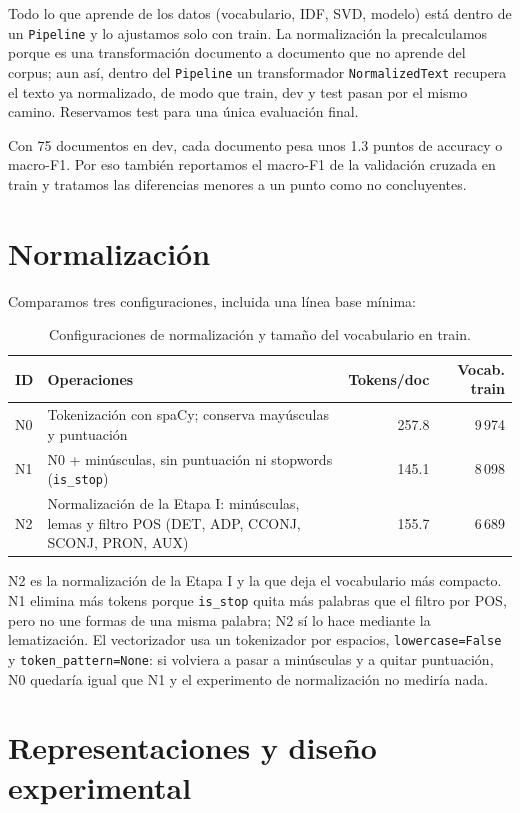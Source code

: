 \documentclass[11pt,a4paper]{article}
\newcommand{\code}[1]{\texttt{#1}}
\begin{document}
Todo lo que aprende de los datos (vocabulario, IDF, SVD, modelo) está dentro de un
\code{Pipeline} y lo ajustamos solo con train. La normalización la precalculamos porque es una
transformación documento a documento que no aprende del corpus; aun así, dentro del
\code{Pipeline} un transformador \code{NormalizedText} recupera el texto ya normalizado,
de modo que train, dev y test pasan por el mismo camino. Reservamos test para una única
evaluación final.

Con 75 documentos en dev, cada documento pesa unos 1.3 puntos de accuracy o macro-F1. Por
eso también reportamos el macro-F1 de la validación cruzada en train y tratamos las
diferencias menores a un punto como no concluyentes.

\section{Normalización}

Comparamos tres configuraciones, incluida una línea base mínima:

\begin{table}[htbp]
\centering
\small
\caption{Configuraciones de normalización y tamaño del vocabulario en train.}
\label{tab:norm}
\begin{tabular}{@{}p{1.1cm}p{7.4cm}rr@{}}
\toprule
ID & Operaciones & Tokens/doc & Vocab. train\\
\midrule
N0 & Tokenización con spaCy; conserva mayúsculas y puntuación & 257.8 & 9\,974\\
N1 & N0 + minúsculas, sin puntuación ni stopwords (\code{is\_stop}) & 145.1 & 8\,098\\
N2 & Normalización de la Etapa I: minúsculas, lemas y filtro POS
(DET, ADP, CCONJ, SCONJ, PRON, AUX) & 155.7 & 6\,689\\
\bottomrule
\end{tabular}
\end{table}

N2 es la normalización de la Etapa I y la que deja el vocabulario más compacto.
N1 elimina más tokens porque \code{is\_stop} quita más palabras que el filtro por POS,
pero no une formas de una misma palabra; N2 sí lo hace mediante la lematización.
El vectorizador usa un tokenizador por espacios, \code{lowercase=False} y
\code{token\_pattern=None}: si volviera a pasar a minúsculas y a quitar puntuación, N0
quedaría igual que N1 y el experimento de normalización no mediría nada.

\section{Representaciones y diseño experimental}
\end{document}
